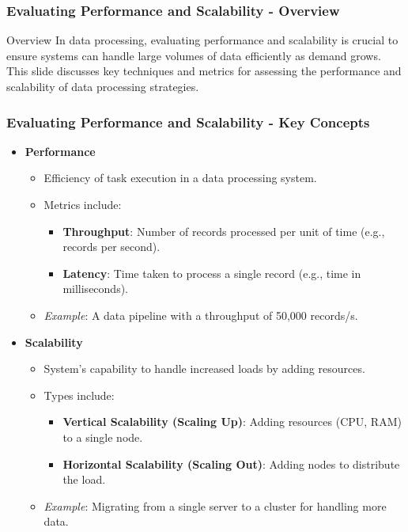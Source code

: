 \documentclass[aspectratio=169]{beamer}
\begin{document}
\begin{frame}[fragile]
    \frametitle{Evaluating Performance and Scalability - Overview}
    \begin{block}{Overview}
        In data processing, evaluating performance and scalability is crucial to ensure systems can handle large volumes of data efficiently as demand grows. This slide discusses key techniques and metrics for assessing the performance and scalability of data processing strategies.
    \end{block}
\end{frame}

\begin{frame}[fragile]
    \frametitle{Evaluating Performance and Scalability - Key Concepts}
    \begin{itemize}
        \item \textbf{Performance}
        \begin{itemize}
            \item Efficiency of task execution in a data processing system.
            \item Metrics include:
            \begin{itemize}
                \item \textbf{Throughput}: Number of records processed per unit of time (e.g., records per second).
                \item \textbf{Latency}: Time taken to process a single record (e.g., time in milliseconds).
            \end{itemize}
            \item \textit{Example}: A data pipeline with a throughput of 50,000 records/s.
        \end{itemize}
        
        \item \textbf{Scalability}
        \begin{itemize}
            \item System’s capability to handle increased loads by adding resources.
            \item Types include:
            \begin{itemize}
                \item \textbf{Vertical Scalability (Scaling Up)}: Adding resources (CPU, RAM) to a single node.
                \item \textbf{Horizontal Scalability (Scaling Out)}: Adding nodes to distribute the load.
            \end{itemize}
            \item \textit{Example}: Migrating from a single server to a cluster for handling more data.
        \end{itemize}
    \end{itemize}
\end{frame}
\end{document}
